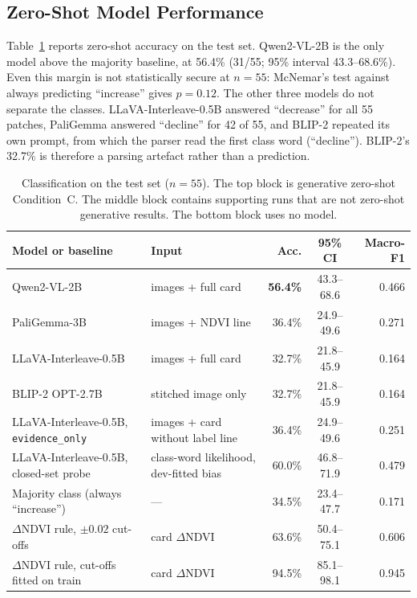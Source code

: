 \documentclass[11pt]{article}
\begin{document}
\subsection{Zero-Shot Model Performance}

Table~\ref{tab:zeroshot} reports zero-shot accuracy on the test set.
Qwen2-VL-2B is the only model above the majority baseline, at 56.4\%
(31/55; 95\% interval 43.3--68.6\%). Even this margin is not
statistically secure at $n = 55$: McNemar's test against always
predicting ``increase'' gives $p = 0.12$. The other three models do not
separate the classes. LLaVA-Interleave-0.5B answered ``decrease'' for
all 55 patches, PaliGemma answered ``decline'' for 42 of 55, and BLIP-2
repeated its own prompt, from which the parser read the first class word
(``decline''). BLIP-2's 32.7\% is therefore a parsing artefact rather
than a prediction.

\begin{table}[t]
\centering
\small
\begin{tabular}{llrcr}
\toprule
Model or baseline & Input & Acc. & 95\% CI & Macro-F1 \\
\midrule
Qwen2-VL-2B & images + full card & \textbf{56.4\%} & 43.3--68.6 & 0.466 \\
PaliGemma-3B & images + NDVI line & 36.4\% & 24.9--49.6 & 0.271 \\
LLaVA-Interleave-0.5B & images + full card & 32.7\% & 21.8--45.9 & 0.164 \\
BLIP-2 OPT-2.7B & stitched image only & 32.7\% & 21.8--45.9 & 0.164 \\
\midrule
LLaVA-Interleave-0.5B, \texttt{evidence\_only} & images + card without label line & 36.4\% & 24.9--49.6 & 0.251 \\
LLaVA-Interleave-0.5B, closed-set probe & class-word likelihood, dev-fitted bias & 60.0\% & 46.8--71.9 & 0.479 \\
\midrule
Majority class (always ``increase'') & --- & 34.5\% & 23.4--47.7 & 0.171 \\
$\Delta$NDVI rule, $\pm 0.02$ cut-offs & card $\Delta$NDVI & 63.6\% & 50.4--75.1 & 0.606 \\
$\Delta$NDVI rule, cut-offs fitted on train & card $\Delta$NDVI & 94.5\% & 85.1--98.1 & 0.945 \\
\bottomrule
\end{tabular}
\caption{Classification on the test set ($n = 55$). The top block is
generative zero-shot Condition~C. The middle block contains supporting
runs that are not zero-shot generative results. The bottom block uses no
model.}
\label{tab:zeroshot}
\end{table}
\end{document}
